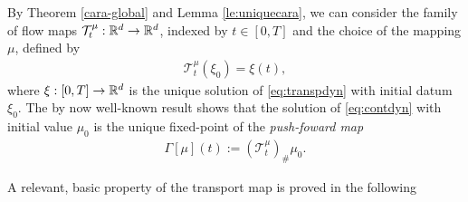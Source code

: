 By Theorem \ref{cara-global} and Lemma \ref{le:uniquecara}, we can consider the family of flow maps $\mathcal{T}^{\mu}_t:\mathbb{R}^d \rightarrow\mathbb{R}^d$, indexed by $t \in [0,T]$ and the choice of the mapping $\mu$, defined by
\begin{align*}
\mathcal{T}^{\mu}_t(\xi_0) = \xi(t),
\end{align*}
where $\xi:[0,T]\rightarrow\mathbb{R}^d$ is the unique solution of \eqref{eq:transpdyn} with initial datum $\xi_0$. The by now well-known result \cite[Theorem 3.10]{CanCarRos10} shows that the solution of \eqref{eq:contdyn} with initial value $\mu_0$ is the unique fixed-point of the \textit{push-foward map}
\begin{align}\label{eq:fixedpoint}
\Gamma[\mu](t) := (\mathcal{T}^{\mu}_t)_{\#}\mu_0.
\end{align}

A relevant, basic property of the transport map is proved in the following

